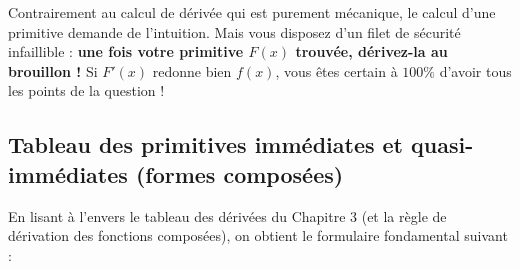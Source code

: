 \begin{astuce}
Contrairement au calcul de dérivée qui est purement mécanique, le calcul d'une primitive demande de l'intuition. Mais vous disposez d'un filet de sécurité infaillible : \textbf{une fois votre primitive $F(x)$ trouvée, dérivez-la au brouillon !} Si $F'(x)$ redonne bien $f(x)$, vous êtes certain à $100\%$ d'avoir tous les points de la question !
\end{astuce}

\subsection{Tableau des primitives immédiates et quasi-immédiates (formes composées)}

En lisant à l'envers le tableau des dérivées du Chapitre 3 (et la règle de dérivation des fonctions composées), on obtient le formulaire fondamental suivant :

